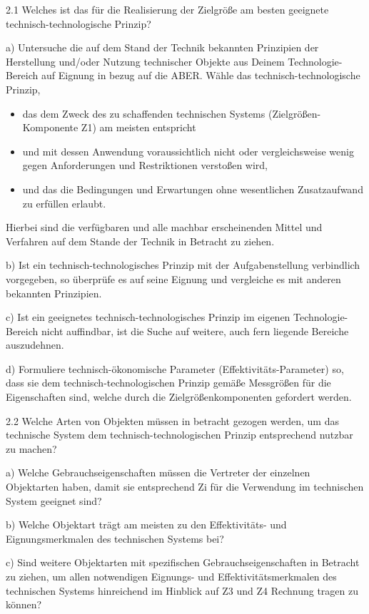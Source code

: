 \documentclass[12pt,a4paper]{article}
\begin{document}
2.1 Welches ist das für die Realisierung der Zielgröße am besten geeignete
technisch-technologische Prinzip?

a) Untersuche die auf dem Stand der Technik bekannten Prinzipien der
Herstellung und/oder Nutzung technischer Objekte aus Deinem Technologie-Bereich
auf Eignung in bezug auf die ABER. Wähle das technisch-technologische Prinzip,
\begin{itemize}
  \item das dem Zweck des zu schaffenden technischen Systems
    (Zielgrößen-Komponente Z1) am meisten entspricht
  \item und mit dessen Anwendung voraussichtlich nicht oder vergleichsweise
    wenig gegen Anforderungen und Restriktionen verstoßen wird,
  \item und das die Bedingungen und Erwartungen ohne wesentlichen Zusatzaufwand
    zu erfüllen erlaubt.
\end{itemize}

Hierbei sind die verfügbaren und alle machbar erscheinenden Mittel und
Verfahren auf dem Stande der Technik in Betracht zu ziehen.

b) Ist ein technisch-technologisches Prinzip mit der Aufgabenstellung
verbindlich vorgegeben, so überprüfe es auf seine Eignung und vergleiche es mit
anderen bekannten Prinzipien.

c) Ist ein geeignetes technisch-technologisches Prinzip im eigenen
Technologie-Bereich nicht auffindbar, ist die Suche auf weitere, auch fern
liegende Bereiche auszudehnen.

d) Formuliere technisch-ökonomische Parameter (Effektivitäts-Parameter) so,
dass sie dem technisch-technologischen Prinzip gemäße Messgrößen für die
Eigenschaften sind, welche durch die Zielgrößenkomponenten gefordert werden.

2.2 Welche Arten von Objekten müssen in betracht gezogen werden, um das
technische System dem technisch-technologischen Prinzip entsprechend nutzbar zu
machen?

a) Welche Gebrauchseigenschaften müssen die Vertreter der einzelnen Objektarten
haben, damit sie entsprechend Zi für die Verwendung im technischen System
geeignet sind?

b) Welche Objektart trägt am meisten zu den Effektivitäts- und
Eignungsmerkmalen des technischen Systems bei?

c) Sind weitere Objektarten mit spezifischen Gebrauchseigenschaften in Betracht
zu ziehen, um allen notwendigen Eignungs- und Effektivitätsmerkmalen des
technischen Systems hinreichend im Hinblick auf Z3 und Z4 Rechnung tragen zu
können?
\end{document}
